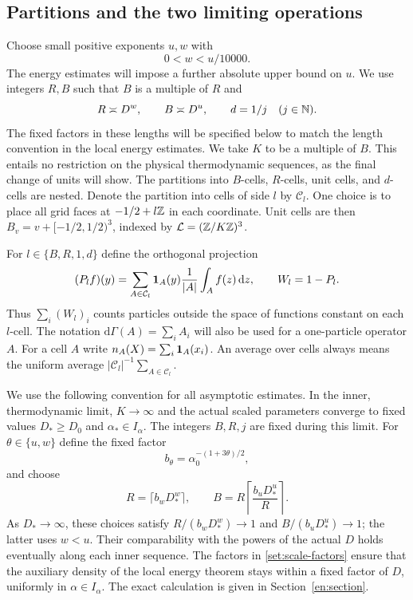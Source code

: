 \subsection{Partitions and the two limiting operations}

Choose small positive exponents $u,w$ with
\begin{equation}\label{set:exponents}
 0<w<u/10000.
\end{equation}
The energy estimates will impose a further absolute upper bound on $u$.
We use integers $R,B$ such that $B$ is a multiple of $R$ and
\begin{equation}\label{set:lengths}
 R\asymp D^w,\qquad B\asymp D^u,
 \qquad d=1/j\quad(j\in\mathbb N).
\end{equation}
The fixed factors in these lengths will be specified below to match
the length convention in the local energy estimates.
We take $K$ to be a multiple of $B$. This entails no restriction on
the physical thermodynamic sequences, as the final change of units will
show. The partitions into $B$-cells, $R$-cells, unit cells, and $d$-cells
are nested. Denote the partition into cells of side $l$ by
$\mathcal C_l$. One choice is to place all grid faces at
$-1/2+l\mathbb Z$ in each coordinate. Unit cells are then
$B_v=v+[-1/2,1/2)^3$, indexed by
$\mathcal L=(\mathbb Z/K\mathbb Z)^3$.

For $l\in\{B,R,1,d\}$ define the orthogonal projection
\begin{equation}\label{set:cell-projection}
 (P_l f)(y)=\sum_{A\in\mathcal C_l}\mathbf 1_A(y)
                   \frac1{|A|}\int_A f(z)\,\mathrm d z,
 \qquad W_l=1-P_l.
\end{equation}
Thus $\sum_i(W_l)_i$ counts particles outside the space of functions
constant on each $l$-cell. The notation $\mathrm d\Gamma(A)=\sum_i A_i$
will also be used for a one-particle operator $A$. For a cell $A$ write
$n_A(X)=\sum_i\mathbf 1_A(x_i)$. An average over cells always means the uniform
average $|\mathcal C_l|^{-1}\sum_{A\in\mathcal C_l}$.

We use the following convention for all asymptotic estimates. In the
inner, thermodynamic limit, $K\to\infty$ and the actual scaled
parameters converge to fixed values $D_*\ge D_0$ and
$\alpha_*\in I_\alpha$. The integers $B,R,j$ are fixed during this
limit. For $\theta\in\{u,w\}$ define the fixed factor
\begin{equation}\label{set:scale-factors}
 b_\theta=\alpha_0^{-(1+3\theta)/2},
\end{equation}
and choose
\begin{equation}\label{set:nested-lengths}
 R=\lceil b_wD_*^w\rceil,
 \qquad B=R\left\lceil\frac{b_uD_*^u}{R}\right\rceil.
\end{equation}
As $D_*\to\infty$, these choices satisfy
$R/(b_wD_*^w)\to1$ and $B/(b_uD_*^u)\to1$; the latter uses $w<u$.
Their comparability with the powers of the actual $D$ holds eventually
along each inner sequence. The factors in \eqref{set:scale-factors}
ensure that the auxiliary density of the local energy theorem stays
within a fixed factor of $D$, uniformly in $\alpha\in I_\alpha$.
The exact calculation is given in Section~\ref{en:section}.

